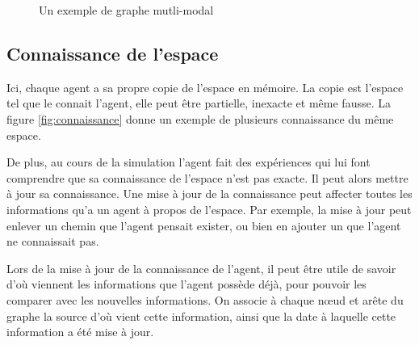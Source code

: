 \documentclass[a4paper]{article}
\begin{document}
\begin{figure}%
  \caption{Un exemple de graphe mutli-modal}
  \label{fig:multimodal}
  \centering
\end{figure}%

  \subsection{Connaissance de l'espace}

Ici, chaque agent a sa propre copie de l'espace en mémoire. La copie est
l'espace tel que le connait l'agent, elle peut être partielle, inexacte et même
fausse. La figure \ref{fig:connaissance} donne un exemple de plusieurs
connaissance du même espace.

De plus, au cours de la simulation l'agent fait des expériences qui lui
font comprendre que sa connaissance de l'espace n'est pas exacte. Il peut
alors mettre à jour sa connaissance. Une mise à jour de la connaissance peut
affecter toutes les informations qu'a un agent à propos de l'espace. Par
exemple, la mise à jour peut enlever un chemin que l'agent pensait exister,
ou bien en ajouter un que l'agent ne connaissait pas.

Lors de la mise à jour de la connaissance de l'agent, il peut être utile de
savoir d'où viennent les informations que l'agent possède déjà, pour pouvoir les
comparer avec les nouvelles informations. On associe à chaque nœud et arête du
graphe la source d'où vient cette information, ainsi que la date à laquelle
cette information a été mise à jour.
\end{document}
